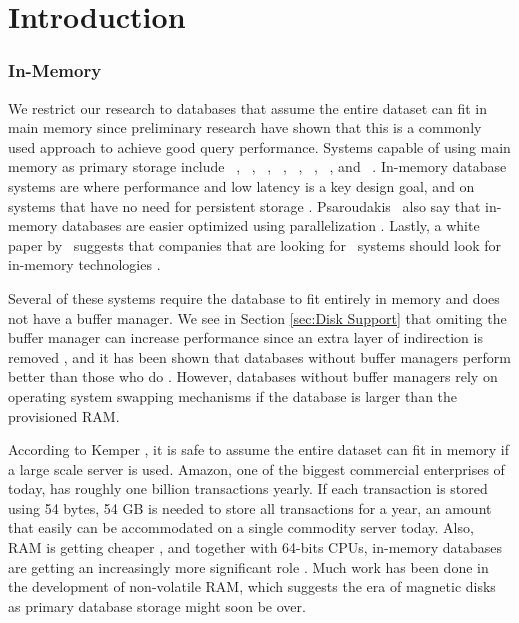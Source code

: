 \chapter{Introduction}
\label{chap:introduction}
\clearpage




\subsection{In-Memory}
\label{sub:In-Memory}
We restrict our research to databases that assume the entire dataset can fit in main memory since preliminary research have shown that this is a commonly used approach to achieve good query performance. Systems capable of using main memory as primary storage include \oracle~\cite{Lahiri2015-mz}, \saph~\cite{Farber2012-vh}, \gorilla~\cite{Pelkonen2015-ko}, \qlikview~\cite{Qlik2011-ef}, \tableau~\cite{Kamkolkar2015-iq}, \monetdb~\cite{Boncz2002-yj}, \blink~\cite{Barber2012-xt}, and \sapnw~\cite{Lemke2010-is}. In-memory database systems are where performance and low latency is a key design goal, and on systems that have no need for persistent storage \cite{Zicari2012-is}. Psaroudakis \ea~also say that in-memory databases are easier optimized using parallelization \cite{Psaroudakis2013-fn}. Lastly, a white paper by \qlikview~suggests that companies that are looking for \bi~systems should look for in-memory technologies \cite{Bereanu2010-tj}. 

Several of these systems require the database to fit entirely in memory and does not have a buffer manager. We see in Section \ref{sec:Disk Support} that omiting the buffer manager can increase performance since an extra layer of indirection is removed \cite{Graefe2014-ds}, and it has been shown that databases without buffer managers perform better than those who do \cite{Ferrari2012-hm}. However, databases without buffer managers rely on operating system swapping mechanisms if the database is larger than the provisioned RAM.

According to Kemper \ea, it is safe to assume the entire dataset can fit in memory \cite{Kemper2011-ap} if a large scale server is used. Amazon, one of the biggest commercial enterprises of today, has roughly one billion transactions yearly. If each transaction is stored using 54 bytes, 54 GB is needed to store all transactions for a year, an amount that easily can be accommodated on a single commodity server today. Also, RAM is getting cheaper \cite{Exasol2014-xh}, and together with 64-bits CPUs, in-memory databases are getting an increasingly more significant role \cite{Delaney2014-ip}. Much work has been done in the development of non-volatile RAM, which suggests the era of magnetic disks as primary database storage might soon be over.

